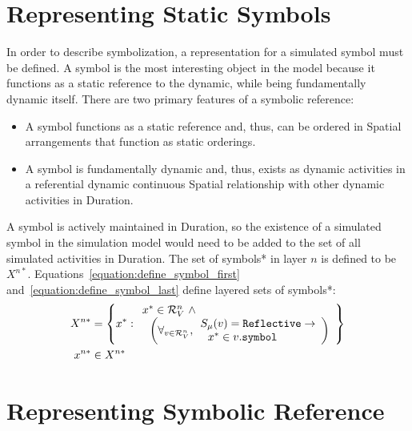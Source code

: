 \section{Representing Static Symbols}

In order to describe symbolization, a representation for a simulated
symbol must be defined.  A symbol is the most interesting object in
the model because it functions as a static reference to the dynamic,
while being fundamentally dynamic itself.  There are two primary
features of a symbolic reference:
\begin{itemize}
\item A symbol functions as a static reference and, thus, can be
  ordered in Spatial arrangements that function as static orderings.
\item A symbol is fundamentally dynamic and, thus, exists as dynamic
  activities in a referential dynamic continuous Spatial relationship
  with other dynamic activities in Duration.
\end{itemize}
A symbol is actively maintained in Duration, so the existence of a
simulated symbol in the simulation model would need to be added to the
set of all simulated activities in Duration.  The set of symbols* in
layer $n$ is defined to be $X^{n*}$.
{\mbox{Equations~\ref{equation:define_symbol_first}}}
{\mbox{and~\ref{equation:define_symbol_last}}} define layered sets of
symbols*:
\begin{align}
\label{equation:define_symbol_first}
           X^{n*} &= \left\{x^* : \begin{array}{l}
                                   x^* \in \mathcal{R}^n_V ~\wedge~ \\
                                   ~~\left(\forall_{v \in \mathcal{R}^n_V}, \begin{array}{l}
                                                                          S_\mu(v) = \text{\tt{Reflective}} \rightarrow \\
                                                                          ~~x^* \in v.\text{\tt{symbol}}
                                                                        \end{array}\right)
                                 \end{array}\right\} \\
\label{equation:define_symbol_last}
           x^{n*} &\in X^{n*}
\end{align}

\section{Representing Symbolic Reference}

